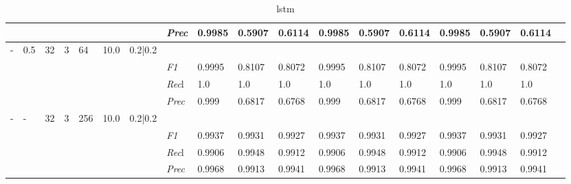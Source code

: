 \begin{table}[]
\begin{tabularx}{\textwidth}{XXXXXXX|X|XXX|XXX|XXXX}
    & & & & & & & \textit{Prec} & 0.9985 & 0.5907 & 0.6114 & 0.9985 & 0.5907 & 0.6114 & 0.9985 & 0.5907 & 0.6114 \\ \midrule
    - & 0.5 & 32 & 3 & 64 &10.0 & 0.2|0.2 & & & & & & & & & \\
    & & & & & & & \textit{F1} & 0.9995 & 0.8107 & 0.8072 & 0.9995 & 0.8107        & 0.8072        & 0.9995        & 0.8107        & 0.8072        \\
    & & & & & & & \textit{Rec}l & 1.0 & 1.0 & 1.0    & 1.0 & 1.0    & 1.0    & 1.0    & 1.0    & 1.0    \\
    & & & & & & & \textit{Prec} & 0.999 & 0.6817 & 0.6768 & 0.999 & 0.6817 & 0.6768 & 0.999 & 0.6817 & 0.6768 \\ \midrule
    - & - & 32 & 3 & 256 &10.0 & 0.2|0.2 & & & & & & & & & \\
    & & & & & & & \textit{F1} & 0.9937 & 0.9931 & 0.9927 & 0.9937 & 0.9931        & 0.9927        & 0.9937        & 0.9931        & 0.9927        \\
    & & & & & & & \textit{Rec}l & 0.9906 & 0.9948 & 0.9912    & 0.9906 & 0.9948    & 0.9912    & 0.9906    & 0.9948    & 0.9912    \\
    & & & & & & & \textit{Prec} & 0.9968 & 0.9913 & 0.9941 & 0.9968 & 0.9913 & 0.9941 & 0.9968 & 0.9913 & 0.9941 \\ \midrule
    \end{tabularx}
    \caption{lstm}
    \label{tab:all_results_lstm}
    \end{table}
    
